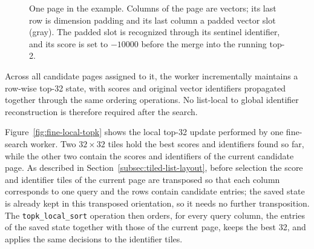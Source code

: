 \begin{figure}[htbp]
\centering
{}
\caption{One page in the example. Columns of the page are vectors; its last
row is dimension padding and its last column a padded vector slot (gray). The
padded slot is recognized through its sentinel identifier, and its score is
set to \(-10000\) before the merge into the running top-2.}
\label{fig:example-page}
\end{figure}

Across all candidate pages assigned to it, the worker incrementally maintains a row-wise top-32 state, with scores and original vector identifiers propagated together through the same ordering operations. No list-local to global identifier reconstruction is therefore required after the search.

Figure~\ref{fig:fine-local-topk} shows the local top-32 update performed by one fine-search worker. Two \(32\times32\) tiles hold the best scores and identifiers found so far, while the other two contain the scores and identifiers of the current candidate page. As described in Section~\ref{subsec:tiled-list-layout}, before selection the score and identifier tiles of the current page are transposed so that each column corresponds to one query and the rows contain candidate entries; the saved state is already kept in this transposed orientation, so it needs no further transposition. The \texttt{topk\_local\_sort} operation then orders, for every query column, the entries of the saved state together with those of the current page, keeps the best 32, and applies the same decisions to the identifier tiles.

